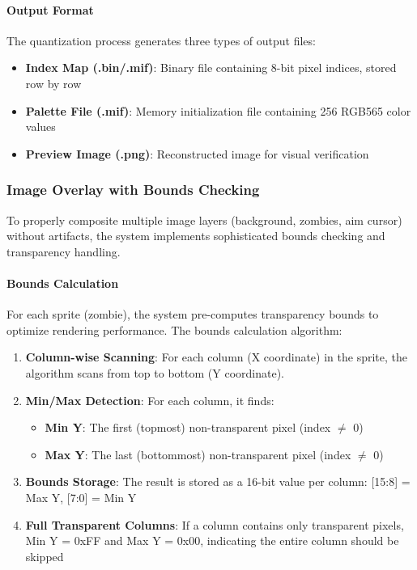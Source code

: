 \documentclass[12pt,a4paper]{article}
\begin{document}
\paragraph{Output Format}
The quantization process generates three types of output files:
\begin{itemize}
    \item \textbf{Index Map (.bin/.mif)}: Binary file containing 8-bit pixel indices, stored row by row
    \item \textbf{Palette File (.mif)}: Memory initialization file containing 256 RGB565 color values
    \item \textbf{Preview Image (.png)}: Reconstructed image for visual verification
\end{itemize}

\subsubsection{Image Overlay with Bounds Checking}
To properly composite multiple image layers (background, zombies, aim cursor) without artifacts, the system implements sophisticated bounds checking and transparency handling.

\paragraph{Bounds Calculation}
For each sprite (zombie), the system pre-computes transparency bounds to optimize rendering performance. The bounds calculation algorithm:
\begin{enumerate}
    \item \textbf{Column-wise Scanning}: For each column (X coordinate) in the sprite, the algorithm scans from top to bottom (Y coordinate).
    \item \textbf{Min/Max Detection}: For each column, it finds:
    \begin{itemize}
        \item \textbf{Min Y}: The first (topmost) non-transparent pixel (index $\neq$ 0)
        \item \textbf{Max Y}: The last (bottommost) non-transparent pixel (index $\neq$ 0)
    \end{itemize}
    \item \textbf{Bounds Storage}: The result is stored as a 16-bit value per column: [15:8] = Max Y, [7:0] = Min Y
    \item \textbf{Full Transparent Columns}: If a column contains only transparent pixels, Min Y = 0xFF and Max Y = 0x00, indicating the entire column should be skipped
\end{enumerate}
\end{document}

